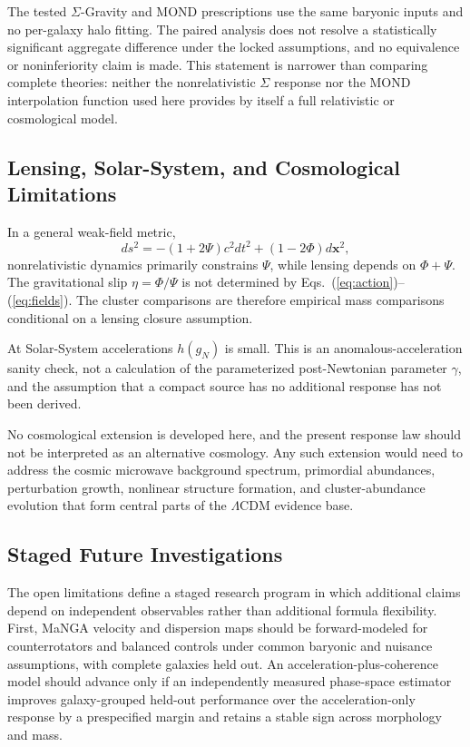 \documentclass[aps,prd,reprint,superscriptaddress,showpacs,floatfix,longbibliography]{revtex4-2}
\begin{document}
The tested $\Sigma$-Gravity and MOND prescriptions use the same baryonic inputs and no per-galaxy halo fitting. The paired analysis does not resolve a statistically significant aggregate difference under the locked assumptions, and no equivalence or noninferiority claim is made. This statement is narrower than comparing complete theories: neither the nonrelativistic $\Sigma$ response nor the MOND interpolation function used here provides by itself a full relativistic or cosmological model.

\subsection{Lensing, Solar-System, and Cosmological Limitations}

In a general weak-field metric,
\begin{equation}
ds^2=-(1+2\Psi)c^2dt^2+(1-2\Phi)d\bm{x}^2,
\label{eq:metric}
\end{equation}
nonrelativistic dynamics primarily constrains $\Psi$, while lensing depends on $\Phi+\Psi$. The gravitational slip $\eta=\Phi/\Psi$ is not determined by Eqs.~(\ref{eq:action})--(\ref{eq:fields}). The cluster comparisons are therefore empirical mass comparisons conditional on a lensing closure assumption.

At Solar-System accelerations $h(g_N)$ is small. This is an anomalous-acceleration sanity check, not a calculation of the parameterized post-Newtonian parameter $\gamma$, and the assumption that a compact source has no additional response has not been derived.

No cosmological extension is developed here, and the present response law should not be interpreted as an alternative cosmology. Any such extension would need to address the cosmic microwave background spectrum, primordial abundances, perturbation growth, nonlinear structure formation, and cluster-abundance evolution that form central parts of the $\Lambda$CDM evidence base.

\subsection{Staged Future Investigations}

The open limitations define a staged research program in which additional claims depend on independent observables rather than additional formula flexibility. First, MaNGA velocity and dispersion maps should be forward-modeled for counterrotators and balanced controls under common baryonic and nuisance assumptions, with complete galaxies held out. An acceleration-plus-coherence model should advance only if an independently measured phase-space estimator improves galaxy-grouped held-out performance over the acceleration-only response by a prespecified margin and retains a stable sign across morphology and mass.
\end{document}

